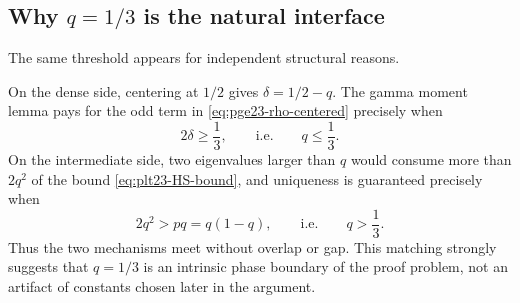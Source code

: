 ﻿\documentclass[11pt]{article}
\numberwithin{equation}{section}
\begin{document}
\subsection{Why \texorpdfstring{$q=1/3$}{q=1/3} is the natural interface}

The same threshold appears for independent structural reasons.

On the dense side, centering at $1/2$ gives $\delta=1/2-q$.
The gamma moment lemma pays for the odd term in \eqref{eq:pge23-rho-centered} precisely when
\[
  2\delta\ge\frac{1}{3},
  \qquad\text{i.e.}\qquad q\le\frac{1}{3}.
\]
On the intermediate side, two eigenvalues larger than $q$ would consume more than $2q^2$ of the bound \eqref{eq:plt23-HS-bound}, and uniqueness is guaranteed precisely when
\[
  2q^2>pq=q(1-q),
  \qquad\text{i.e.}\qquad q>\frac{1}{3}.
\]
Thus the two mechanisms meet without overlap or gap.
This matching strongly suggests that $q=1/3$ is an intrinsic phase boundary of the proof problem, not an artifact of constants chosen later in the argument.
\end{document}
